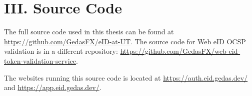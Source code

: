 \section*{III. Source Code}
\label{appendix:source}

The full source code used in this thesis can be found at \url{https://github.com/GedasFX/eID-at-UT}. The source code for Web eID OCSP validation is in a different repository: \url{https://github.com/GedasFX/web-eid-token-validation-service}.

The websites running this source code is located at \url{https://auth.eid.gedas.dev/} and \url{https://app.eid.gedas.dev/}.